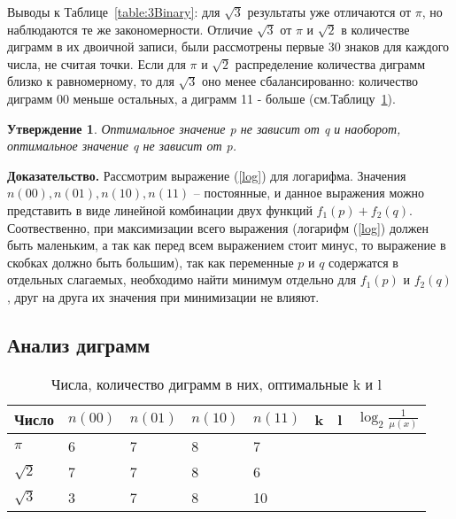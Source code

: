\documentclass[12pt]{article}
\newtheorem{sttm}{Утверждение}
\begin{document}
	Выводы к Таблице~\ref{table:3Binary}: для $\sqrt{3}$ результаты уже отличаются от $\pi$, но наблюдаются те же закономерности. Отличие $\sqrt{3}$ от $\pi$ и $\sqrt{2}$ в количестве диграмм в их двоичной записи, были рассмотрены первые 30 знаков для каждого числа, не считая точки. Если для $\pi$ и $\sqrt{2}$ распределение количества диграмм близко к равномерному, то для $\sqrt{3}$ оно менее сбалансированно: количество диграмм 00 меньше остальных, а диграмм 11 - больше (см.Таблицу~\ref{table:digramsPi23}).
	
	\begin{sttm}\label{sttm:independence} Оптимальное значение p не зависит от q и наоборот, оптимальное значение q не зависит от p.
	\end{sttm}
	{\bf Доказательство.} Рассмотрим выражение (\ref{log}) для логарифма. Значения $n(00), n(01), n(10),n(11)$ -- постоянные, и данное выражения можно представить в виде линейной комбинации двух функций $f_1(p)+f_2(q)$. Соотвественно, при максимизации всего выражения (логарифм (\ref{log}) должен быть маленьким, а так как перед всем выражением стоит минус, то выражение в скобках должно быть большим), так как переменные $p$ и $q$ содержатся в отдельных слагаемых, необходимо найти минимум отдельно для $f_1(p)$ и $f_2(q)$, друг на друга их значения при минимизации не влияют. 
	
	\subsection*{Анализ диграмм}
	
	
	\begin{table}[!h]
		\caption{Числа, количество диграмм в них, оптимальные k и l}
		\label{table:digramsPi23}
		\begin{center}
			\begin{tabular}{|l|l|l|l|l|l|l|l|}
			\hline
			Число & $n(00)$ & $n(01)$ & $n(10)$ & $n(11)$ & k & l & $\log_2{\frac{1}{\mu(x)}}$\\
			\hline
			$\pi$ & 6 & 7 & 8 & 7 &&&\\
			\hline
			$\sqrt{2}$ & 7 & 7 & 8 & 6 &&&\\
			\hline
			$\sqrt{3}$ & 3 & 7 & 8 & 10 &&&\\
			\hline
		\end{tabular}
	\end{center}
	\end{table}
\end{document}
